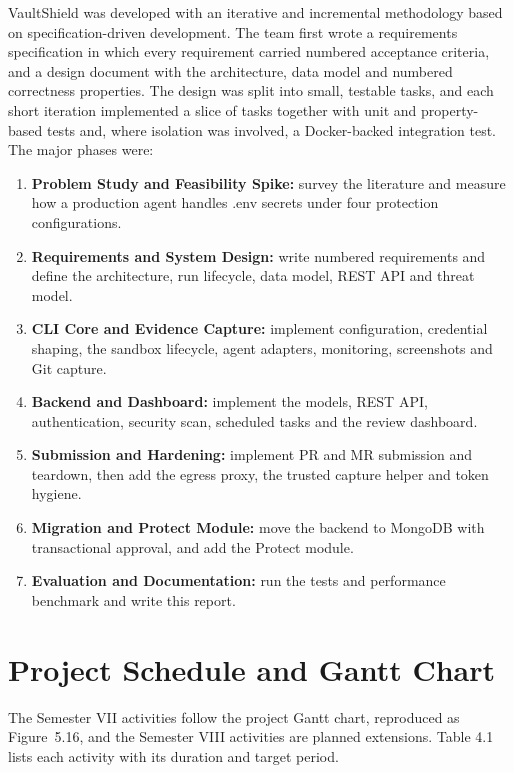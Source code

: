 \documentclass[12pt,a4paper,oneside]{report}
\providecommand{\tightlist}{\setlength{\itemsep}{0pt}\setlength{\parskip}{0pt}}
\begin{document}
VaultShield was developed with an iterative and incremental methodology based on specification-driven development. The team first wrote a requirements specification in which every requirement carried numbered acceptance criteria, and a design document with the architecture, data model and numbered correctness properties. The design was split into small, testable tasks, and each short iteration implemented a slice of tasks together with unit and property-based tests and, where isolation was involved, a Docker-backed integration test. The major phases were:

\begin{enumerate}
\tightlist
\item
  \textbf{Problem Study and Feasibility Spike:} survey the literature and measure how a production agent handles .env secrets under four protection configurations.
\item
  \textbf{Requirements and System Design:} write numbered requirements and define the architecture, run lifecycle, data model, REST API and threat model.
\item
  \textbf{CLI Core and Evidence Capture:} implement configuration, credential shaping, the sandbox lifecycle, agent adapters, monitoring, screenshots and Git capture.
\item
  \textbf{Backend and Dashboard:} implement the models, REST API, authentication, security scan, scheduled tasks and the review dashboard.
\item
  \textbf{Submission and Hardening:} implement PR and MR submission and teardown, then add the egress proxy, the trusted capture helper and token hygiene.
\item
  \textbf{Migration and Protect Module:} move the backend to MongoDB with transactional approval, and add the Protect module.
\item
  \textbf{Evaluation and Documentation:} run the tests and performance benchmark and write this report.
\end{enumerate}

\section{Project Schedule and Gantt Chart}\label{project-schedule}

The Semester VII activities follow the project Gantt chart, reproduced as Figure~5.16, and the Semester VIII activities are planned extensions. Table 4.1 lists each activity with its duration and target period.
\end{document}
